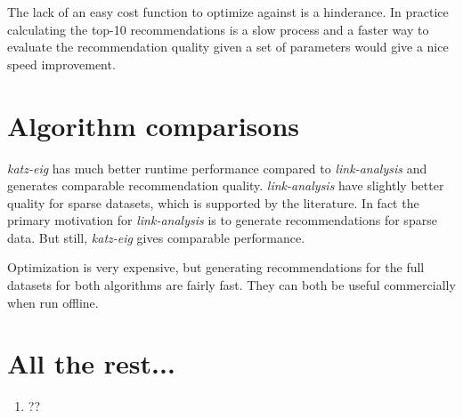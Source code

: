 The lack of an easy cost function to optimize against is a hinderance. In practice calculating the top-10 recommendations is a slow process and a faster way to evaluate the recommendation quality given a set of parameters would give a nice speed improvement.


\section{Algorithm comparisons}

\textit{katz-eig} has much better runtime performance compared to \textit{link-analysis} and generates comparable recommendation quality. \textit{link-analysis} have slightly better quality for sparse datasets, which is supported by the literature. In fact the primary motivation for \textit{link-analysis} is to generate recommendations for sparse data. But still, \textit{katz-eig} gives comparable performance.

Optimization is very expensive, but generating recommendations for the full datasets for both algorithms are fairly fast. They can both be useful commercially when run offline.


\section{All the rest...}

\begin{enumerate}
    \item ??
\end{enumerate}




